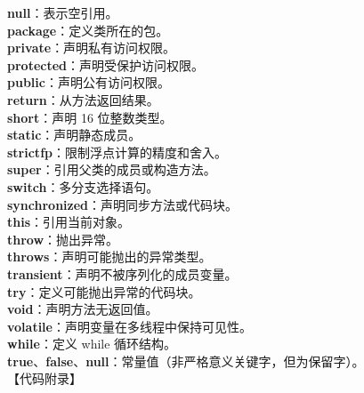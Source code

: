 \documentclass[12pt,a4paper]{article}
\begin{document}
\textbf{null}：表示空引用。\\
\textbf{package}：定义类所在的包。\\
\textbf{private}：声明私有访问权限。\\
\textbf{protected}：声明受保护访问权限。\\
\textbf{public}：声明公有访问权限。\\
\textbf{return}：从方法返回结果。\\
\textbf{short}：声明 16 位整数类型。\\
\textbf{static}：声明静态成员。\\
\textbf{strictfp}：限制浮点计算的精度和舍入。\\
\textbf{super}：引用父类的成员或构造方法。\\
\textbf{switch}：多分支选择语句。\\
\textbf{synchronized}：声明同步方法或代码块。\\
\textbf{this}：引用当前对象。\\
\textbf{throw}：抛出异常。\\
\textbf{throws}：声明可能抛出的异常类型。\\
\textbf{transient}：声明不被序列化的成员变量。\\
\textbf{try}：定义可能抛出异常的代码块。\\
\textbf{void}：声明方法无返回值。\\
\textbf{volatile}：声明变量在多线程中保持可见性。\\
\textbf{while}：定义 while 循环结构。\\
\textbf{true}、\textbf{false}、\textbf{null}：常量值（非严格意义关键字，但为保留字）。\\
\newpage
{【代码附录】}\\
\end{document}
